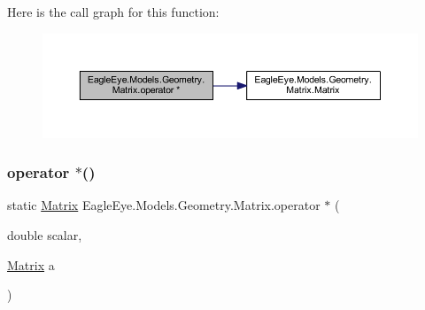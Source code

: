 Here is the call graph for this function\+:\nopagebreak
\begin{figure}[H]
\begin{center}
\leavevmode
\includegraphics[width=350pt]{class_eagle_eye_1_1_models_1_1_geometry_1_1_matrix_a825588a358515f9e6871df1a30354fcc_cgraph}
\end{center}
\end{figure}
\mbox{\label{class_eagle_eye_1_1_models_1_1_geometry_1_1_matrix_a737d113f236731736d5169255bb05ef7}} 
\subsubsection{\texorpdfstring{operator $\ast$()}{operator *()}\hspace{0.1cm}{\footnotesize\ttfamily [4/4]}}
{\footnotesize\ttfamily static \mbox{\hyperlink{class_eagle_eye_1_1_models_1_1_geometry_1_1_matrix}{Matrix}} Eagle\+Eye.\+Models.\+Geometry.\+Matrix.\+operator $\ast$ (\begin{DoxyParamCaption}\item[{double}]{scalar,  }\item[{\mbox{\hyperlink{class_eagle_eye_1_1_models_1_1_geometry_1_1_matrix}{Matrix}}}]{a }\end{DoxyParamCaption})\hspace{0.3cm}{\ttfamily [static]}}

\mbox{\label{class_eagle_eye_1_1_models_1_1_geometry_1_1_matrix_ae4247c2e9fd018350037b01fb64c53cc}} 
